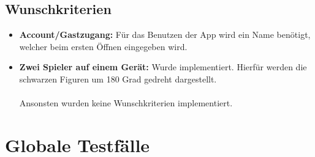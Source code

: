 \documentclass[parskip=full]{scrartcl}
\begin{document}
\subsection{Wunschkriterien}
\begin{itemize}
\item{\textbf{Account/Gastzugang:}} Für das Benutzen der App wird ein Name benötigt, welcher beim ersten Öffnen eingegeben wird. 
\item{\textbf{Zwei Spieler auf einem Gerät:}} Wurde implementiert. Hierfür werden die schwarzen Figuren um 180 Grad gedreht dargestellt. \\
\\
Ansonsten wurden keine Wunschkriterien implementiert.
\end{itemize}
\section{Globale Testfälle}
\end{document}
